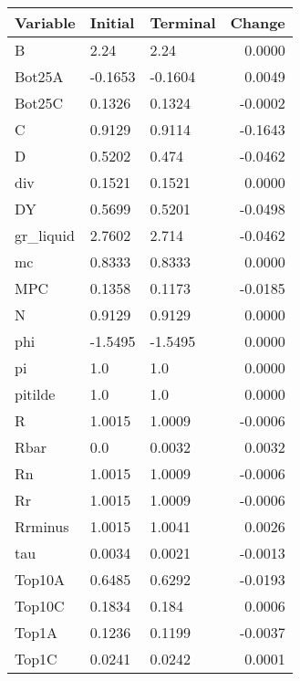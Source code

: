 \begin{table}
\centering
\label{tab:stst_comparison_low_B_wedge_permanent}
\begin{tabular}{lllr}
\toprule
                Variable & Initial & Terminal &  Change \\
\midrule
                       B &    2.24 &     2.24 &  0.0000 \\
                  Bot25A & -0.1653 &  -0.1604 &  0.0049 \\
                  Bot25C &  0.1326 &   0.1324 & -0.0002 \\
                       C &  0.9129 &   0.9114 & -0.1643 \\
                       D &  0.5202 &    0.474 & -0.0462 \\
                     div &  0.1521 &   0.1521 &  0.0000 \\
                      DY &  0.5699 &   0.5201 & -0.0498 \\
               gr\_liquid &  2.7602 &    2.714 & -0.0462 \\
                      mc &  0.8333 &   0.8333 &  0.0000 \\
                     MPC &  0.1358 &   0.1173 & -0.0185 \\
                       N &  0.9129 &   0.9129 &  0.0000 \\
                     phi & -1.5495 &  -1.5495 &  0.0000 \\
                      pi &     1.0 &      1.0 &  0.0000 \\
                 pitilde &     1.0 &      1.0 &  0.0000 \\
                       R &  1.0015 &   1.0009 & -0.0006 \\
                    Rbar &     0.0 &   0.0032 &  0.0032 \\
                      Rn &  1.0015 &   1.0009 & -0.0006 \\
                      Rr &  1.0015 &   1.0009 & -0.0006 \\
                 Rrminus &  1.0015 &   1.0041 &  0.0026 \\
                     tau &  0.0034 &   0.0021 & -0.0013 \\
                  Top10A &  0.6485 &   0.6292 & -0.0193 \\
                  Top10C &  0.1834 &    0.184 &  0.0006 \\
                   Top1A &  0.1236 &   0.1199 & -0.0037 \\
                   Top1C &  0.0241 &   0.0242 &  0.0001 \\

\end{tabular}
\end{table}
